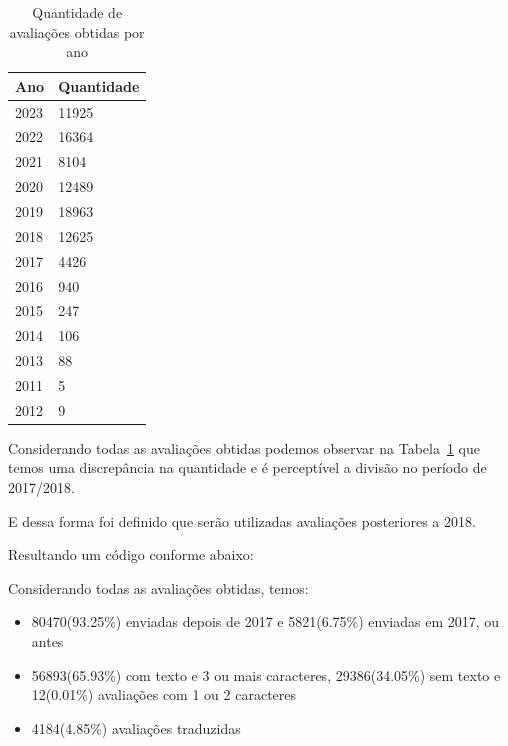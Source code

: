 \begin{table}[]
	\centering
	\begin{tabular}{|l|l|}
		\hline
		\textbf{Ano} & \textbf{Quantidade} \\\hline
		2023         & 11925               \\
		2022         & 16364               \\
		2021         & 8104                \\
		2020         & 12489               \\
		2019         & 18963               \\
		2018         & 12625               \\
		2017         & 4426                \\
		2016         & 940                 \\
		2015         & 247                 \\
		2014         & 106                 \\
		2013         & 88                  \\
		2011         & 5                   \\
		2012         & 9                   \\
		\hline
	\end{tabular}%
	\caption{Quantidade de avaliações obtidas por ano}
	\label{table:review_per_year}
\end{table}

Considerando todas as avaliações obtidas podemos observar na Tabela~\ref{table:review_per_year} que temos uma discrepância na quantidade e é perceptível a divisão no período de 2017/2018.

E dessa forma foi definido que serão utilizadas avaliações posteriores a 2018.

Resultando um código conforme abaixo:



Considerando todas as avaliações obtidas, temos:

\begin{itemize}
	\item 80470(93.25\%) enviadas depois de 2017 e 5821(6.75\%) enviadas em 2017, ou antes
	\item 56893(65.93\%) com texto e 3 ou mais caracteres, 29386(34.05\%) sem texto e 12(0.01\%) avaliações com 1 ou 2 caracteres
	\item 4184(4.85\%) avaliações traduzidas
\end{itemize}

